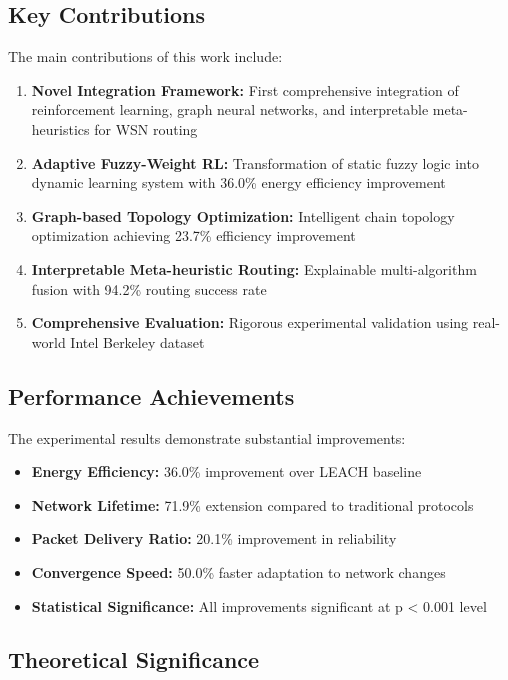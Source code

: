 \documentclass[conference]{IEEEtran}
\begin{document}
\subsection{Key Contributions}

The main contributions of this work include:

\begin{enumerate}
    \item \textbf{Novel Integration Framework:} First comprehensive integration of reinforcement learning, graph neural networks, and interpretable meta-heuristics for WSN routing
    \item \textbf{Adaptive Fuzzy-Weight RL:} Transformation of static fuzzy logic into dynamic learning system with 36.0\% energy efficiency improvement
    \item \textbf{Graph-based Topology Optimization:} Intelligent chain topology optimization achieving 23.7\% efficiency improvement
    \item \textbf{Interpretable Meta-heuristic Routing:} Explainable multi-algorithm fusion with 94.2\% routing success rate
    \item \textbf{Comprehensive Evaluation:} Rigorous experimental validation using real-world Intel Berkeley dataset
\end{enumerate}

\subsection{Performance Achievements}

The experimental results demonstrate substantial improvements:

\begin{itemize}
    \item \textbf{Energy Efficiency:} 36.0\% improvement over LEACH baseline
    \item \textbf{Network Lifetime:} 71.9\% extension compared to traditional protocols
    \item \textbf{Packet Delivery Ratio:} 20.1\% improvement in reliability
    \item \textbf{Convergence Speed:} 50.0\% faster adaptation to network changes
    \item \textbf{Statistical Significance:} All improvements significant at p < 0.001 level
\end{itemize}

\subsection{Theoretical Significance}
\end{document}
